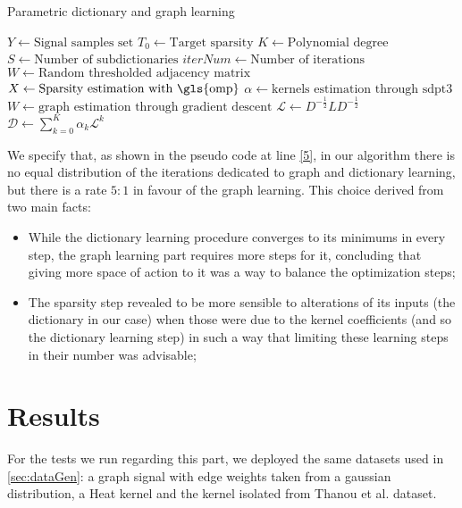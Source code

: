 \begin{algorithm}[htbp]
  \caption{Parametric dictionary and graph learning}
  \begin{algorithmic}[1]
      \State $Y \gets \text{Signal samples set}$
      \State $T_0\gets \text{Target sparsity}$
      \State $K \gets \text{Polynomial degree}$
      \State $S \gets \text{Number of subdictionaries}$
      \State $iterNum \gets \text{Number of iterations}$
      \State $W \gets \text{Random thresholded adjacency matrix}$
    \EndProcedure
        \State $X \gets \text{Sparsity estimation with \gls{omp}}$
      \EndProcedure
         \label{5}
          \State $\alpha \gets \text{kernels estimation through sdpt3}$
        \Else
          \State $W \gets \text{graph estimation through gradient descent}$
          \State $\mathcal{L} \gets D^{-\frac{1}{2}}LD^{-\frac{1}{2}}$
        \EndIf
      \EndProcedure
        \State $\mathcal{D} \gets \sum_{k=0}^K \alpha_k \mathcal{L}^k$
      \EndProcedure
    \EndFor
    \end{algorithmic}
\end{algorithm}

We specify that, as shown in the pseudo code at line \ref{5}, in our algorithm there is no equal distribution of the iterations dedicated to graph and dictionary learning, but there is a rate $5:1$ in favour of the graph learning. This choice derived from two main facts:
\begin{itemize}
\item While the dictionary learning procedure converges to its minimums in every step, the graph learning part requires more steps for it, concluding that giving more space of action to it was a way to balance the optimization steps;
\item The sparsity step revealed to be more sensible to alterations of its inputs (the dictionary in our case) when those were due to the kernel coefficients (and so the dictionary learning step) in such a way that limiting these learning steps in their number was advisable;
\end{itemize}

\section{Results}
For the tests we run regarding this part, we deployed the same datasets used in \autoref{sec:dataGen}: a graph signal with edge weights taken from a gaussian distribution, a Heat kernel and the kernel isolated from Thanou et al. dataset.

